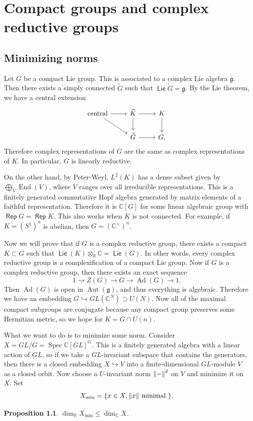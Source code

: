 \documentclass[leqno, openany]{memoir}
\newtheorem{prop}[thm]{Proposition}
\theoremstyle{definition}
\theoremstyle{remark}
\theoremstyle{plain}
\theoremstyle{definition}
\theoremstyle{remark}
\newcommand{\R}{\mathbb{R}}
\newcommand{\C}{\mathbb{C}}
\newcommand{\mf}[1]{\mathfrak{#1}}
\newcommand{\wtl}[1]{\widetilde{#1}}
\DeclareMathOperator{\End}{End}
\DeclareMathOperator{\Ad}{Ad}
\DeclareMathOperator{\Aut}{Aut}
\DeclareMathOperator{\Spec}{Spec}
\DeclareMathOperator{\Lie}{\mathsf{Lie}}
\DeclareMathOperator{\Rep}{\mathsf{Rep}}
\begin{document}
\chapter{Compact groups and complex reductive groups}%
\label{cha:compact_groups_and_complex_reductive_groups}

\section{Minimizing norms}%
\label{sec:minimizing_norms}

Let $G$ be a compact Lie group. This is associated to a complex Lie algebra $\mf{g}$. Then there exists a simply connected $\wtl{G}$ such that $\Lie \wtl{G} = \mf{g}$. By the Lie theorem, we have a central extension
\begin{equation*}
\begin{tikzcd}
    \text{central} \ar{r} \ar{dr} & \wtl{K} \ar{r} \ar{d} & K \ar{d} \\
                                  & \wtl{G} \ar{r} & G.
\end{tikzcd}
\end{equation*}
Therefore complex representations of $G$ are the same as complex representations of $K$. In particular, $G$ is linearly reductive.

On the other hand, by Peter-Weyl, $L^2(K)$ has a dense subset given by $\bigoplus_{V} \End(V)$, where $V$ ranges over all irreducible representations. This is a finitely generated commutative Hopf algebra generated by matrix elements of a faithful representation. Therefore it is $\C[G]$ for some linear algebraic group with $\Rep G = \Rep K$. This also works when $K$ is not connected. For example, if $K = {(S^1)}^n$ is abelian, then $G = {(\C^{\times})}^n$.

Now we will prove that if $G$ is a complex reductive group, there exists a compact $K \subset G$ such that $\Lie(K) \otimes_{\R} \C = \Lie(G)$. In other words, every complex reductive group is a complexification of a compact Lie group. Now if $G$ is a complex reductive group, then there exists an exact sequence
\[ 1 \to Z(G) \to G \to \Ad(G) \to 1. \]
Then $\Ad(G)$ is open in $\Aut(\mf{g})$, and thus everything is algebraic. Therefore we have an embedding $G \hookrightarrow GL(\C^N) \supset U(N)$. Now all of the maximal compact subgroups are conjugate because any compact group preserves some Hermitian metric, so we hope for $K = G \cap U(n)$.

What we want to do is to minimize some norm. Consider $X = GL/G = {\Spec \C[GL]}^G$. This is a finitely generated algebra with a linear action of $GL$, so if we take a $GL$-invariant subspace that contains the generators, then there is a closed embedding $X \hookrightarrow V$ into a finite-dimensional $GL$-module $V$ as a closed orbit. Now choose a $U$-invariant norm $\norm{-}^2$ on $V$ and minimize it on $X$. Set
\[ X_{\min} = \qty{x \in X, \norm{x} \text{ minimal }}. \]
\begin{prop}
    $\dim_{\R} X_{\min} \leq \dim_{\C} X$.
\end{prop}
\end{document}
